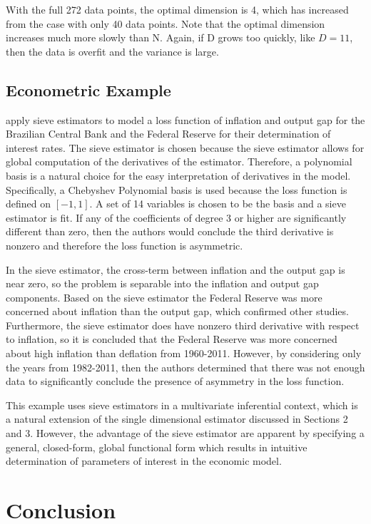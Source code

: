 \documentclass[12pt]{article}  %
\begin{document}
With the full 272 data points, the optimal dimension is 4, which has increased from the case with only 40 data points. Note that the optimal dimension increases much more slowly than N. Again, if D grows too quickly,  like $D = 11$, then the data is overfit and the variance is large. 


\subsection{Econometric Example}

\cite{Sa} apply sieve estimators to model a loss function of inflation and output gap for the Brazilian Central Bank and the Federal Reserve for their determination of interest rates.  The sieve estimator is chosen because the sieve estimator allows for global computation of the derivatives of the estimator. Therefore, a polynomial basis is a natural choice for the easy interpretation of derivatives in the model. Specifically, a Chebyshev Polynomial basis is used because the loss function is defined on $[-1,1]$.  A set of 14 variables is chosen to be the basis and a sieve estimator is fit. If any of the coefficients of degree 3 or higher are significantly different than zero, then the authors would conclude the third derivative is nonzero and therefore the loss function is asymmetric. 

In the sieve estimator, the cross-term between inflation and the output gap is near zero, so the problem is separable into the inflation and output gap components. Based on the sieve estimator the Federal Reserve was more concerned about inflation than the output gap, which confirmed other studies. Furthermore, the sieve estimator does have nonzero third derivative with respect to inflation, so it is concluded that the Federal Reserve was more concerned about high inflation than deflation from 1960-2011. However, by considering only the years from 1982-2011, then the authors determined that there was not enough data to significantly conclude the presence of asymmetry in the loss function.  

This example uses sieve estimators in a multivariate inferential context, which is a natural extension of the single dimensional estimator discussed in Sections 2 and 3. However, the advantage of the sieve estimator are apparent by specifying a general, closed-form, global functional form which results in intuitive determination of parameters of interest in the economic model. 

\section{Conclusion}
\end{document}
